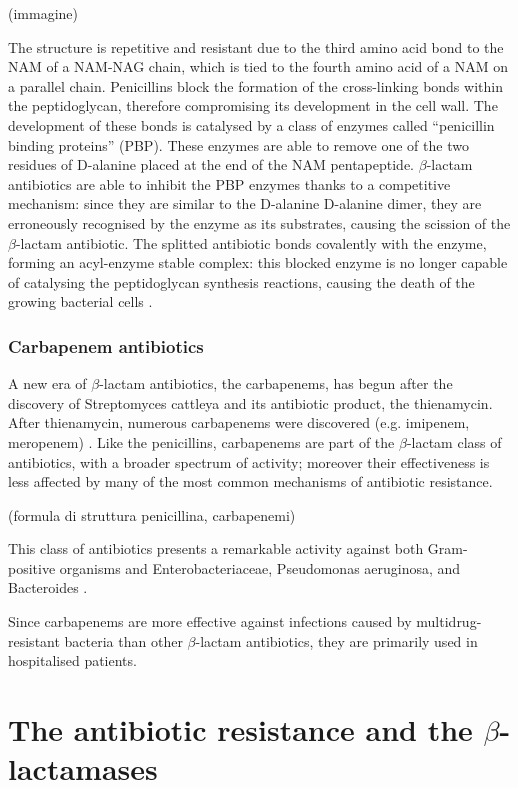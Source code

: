 \documentclass[11pt]{report}
\begin{document}
(immagine)

The structure is repetitive and resistant due to the third amino acid bond to the NAM of a NAM-NAG chain, which is tied to the fourth amino acid of a NAM on a parallel chain.
Penicillins block the formation of the cross-linking bonds within the peptidoglycan, therefore compromising its development in the cell wall. 
The development of these bonds is catalysed by a class of enzymes called “penicillin binding proteins” (PBP). These enzymes are able to remove one of the two residues of D-alanine placed at the end of the NAM pentapeptide.
$\beta$-lactam antibiotics are able to inhibit the PBP enzymes thanks to a competitive mechanism: since they are similar to the D-alanine D-alanine dimer, they are erroneously recognised by the enzyme as its substrates, causing the scission of the $\beta$-lactam antibiotic. 
The splitted antibiotic bonds covalently with the enzyme, forming an acyl-enzyme stable complex: this blocked enzyme is no longer capable of catalysing the peptidoglycan synthesis reactions, causing the death of the growing bacterial cells \cite{kong2010beta}.


\subsection{Carbapenem antibiotics}
A new era of $\beta$-lactam antibiotics, the carbapenems, has begun after the discovery of Streptomyces cattleya and its antibiotic product, the thienamycin.
After thienamycin, numerous carbapenems were discovered (e.g. imipenem, meropenem) \cite{Birnbaum1985}.
Like the penicillins, carbapenems are part of the $\beta$-lactam class of antibiotics, with a broader spectrum of activity; moreover their effectiveness is less affected by many of the most common mechanisms of antibiotic resistance.

(formula di struttura penicillina, carbapenemi)

This class of antibiotics presents a remarkable activity against both Gram-positive organisms and Enterobacteriaceae, Pseudomonas aeruginosa, and Bacteroides \cite{Neu1985}.

Since carbapenems are more effective against infections caused by multidrug-resistant bacteria than other $\beta$-lactam antibiotics, they are primarily used in hospitalised patients.

\chapter{The antibiotic resistance and the $\beta$-lactamases}
\end{document}
